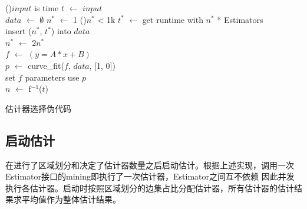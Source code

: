 \documentclass[master]{thesis-uestc}
\begin{document}
\begin{algorithm}
    
    \uIf(){$input$ is time}{
        $t$ $\leftarrow$ $input$\\
        $data$ $\leftarrow$ $\emptyset$
        $n^*$ $\leftarrow$ 1
        \While(){$n^*$ < 1k}{
            $t^*$ $\leftarrow$ get runtime with $n^*$ * Estimators\\
            insert ($n^*$, $t^*$) into $data$\\
            $n^*$ $\leftarrow$ $2n^*$\\
        }
        $f$ $\leftarrow$ $(y = A*x + B)$\\
        $p$ $\leftarrow$ curve\_fit($f$, $data$, [1, 0]) \\
        set $f$ parameters use $p$\\
        $n$ $\leftarrow$ f$^{-1}$($t$)\\
    }
    \caption{估计器选择伪代码}
    \label{alg:elp}
\end{algorithm}

\subsection{启动估计}
\label{subsec:launch}
    在进行了区域划分和决定了估计器数量之后启动估计。根据上述实现，调用一次Estimator接口的mining即执行了一次估计器，Estimator之间互不依赖
因此并发执行各估计器。启动时按照区域划分的边集占比分配估计器，所有估计器的估计结果求平均值作为整体估计结果。
\end{document}
